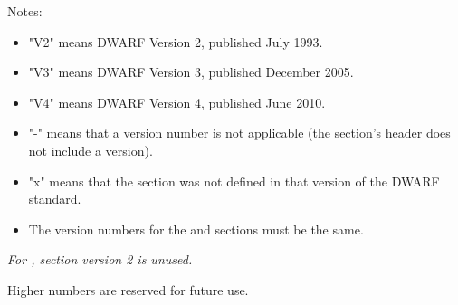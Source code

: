 Notes:

\begin{itemize}
\item  "V2" means DWARF Version 2, published July 1993.
\item  "V3" means DWARF Version 3, published December 2005.
\item  "V4" means DWARF Version 4, published June 2010.
\item  "-" means that a version number is not applicable
(the section's header does not include a version).

\item  "x" means that the section was not defined in that
version of the DWARF standard.

\item  The version numbers for the  and 
sections must be the same.

\end{itemize}

\textit{For , section version 2 is unused.}

Higher numbers are reserved for future use.

